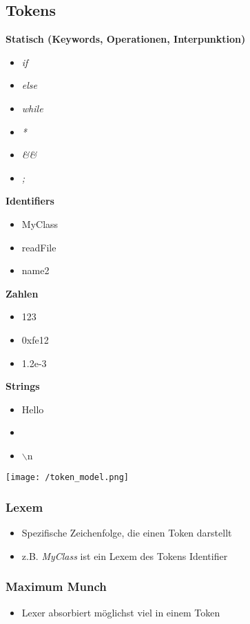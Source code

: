 \subsection{Tokens}
\textbf{Statisch (Keywords, Operationen, Interpunktion)}
\begin{itemize}
    \item \textit{if}
    \item \textit{else}
    \item \textit{while}
    \item \textit{*}
    \item \textit{\&\&}
    \item \textit{;}
\end{itemize}
\textbf{Identifiers}
\begin{itemize}
    \item MyClass
    \item readFile
    \item name2
\end{itemize}
\textbf{Zahlen}
\begin{itemize}
    \item 123
    \item 0xfe12
    \item 1.2e-3
\end{itemize}
\textbf{Strings}
\begin{itemize}
    \item \dq Hello\dq
    \item \dq \dq
    \item \dq $\backslash$n\dq
\end{itemize}
\begin{center}
    \texttt{[image: /token\_model.png]} 
\end{center}

\subsubsection{Lexem}
\begin{itemize}
    \item Spezifische Zeichenfolge, die einen Token darstellt
    \item z.B. \textit{MyClass} ist ein Lexem des Tokens Identifier
\end{itemize}

\subsubsection{Maximum Munch}
\begin{itemize}
    \item Lexer absorbiert möglichst viel in einem Token
\end{itemize}

